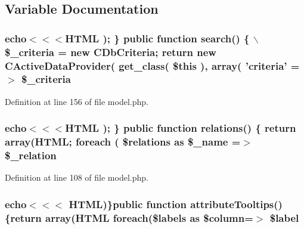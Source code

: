 \subsection{Variable Documentation}
\hypertarget{gii_2model_2templates_2default_2model_8php_a28a116c3d6d8901fe4023b3d9bf7bf4c}{
\subsubsection[{\$\_\-criteria}]{\setlength{\rightskip}{0pt plus 5cm}echo$<$$<$$<${\bf HTML} ); \} public function search() \{ $\backslash$\$\_\-criteria = new CDbCriteria; return new CActiveDataProvider( get\_\-class( \$this ), {\bf array}( 'criteria' =$>$ \$\_\-criteria}}
\label{gii_2model_2templates_2default_2model_8php_a28a116c3d6d8901fe4023b3d9bf7bf4c}


Definition at line 156 of file model.php.

\hypertarget{gii_2model_2templates_2default_2model_8php_aaf1b455f91b5583cb37930979eedc6d5}{
\subsubsection[{\$\_\-relation}]{\setlength{\rightskip}{0pt plus 5cm}echo$<$$<$$<${\bf HTML} ); \} public function relations() \{ return {\bf array}({\bf HTML}; {\bf foreach} ( \$relations as \$\_\-name =$>$ \$\_\-relation}}
\label{gii_2model_2templates_2default_2model_8php_aaf1b455f91b5583cb37930979eedc6d5}


Definition at line 108 of file model.php.

\hypertarget{gii_2model_2templates_2default_2model_8php_a92ae3eac75e60335c146412727e9aa46}{
\subsubsection[{\$label}]{\setlength{\rightskip}{0pt plus 5cm}echo$<$$<$$<$ {\bf HTML})\}public function attributeTooltips()\{return {\bf array}({\bf HTML} {\bf foreach}(\$labels as \$column=$>$ \$label}}
\label{gii_2model_2templates_2default_2model_8php_a92ae3eac75e60335c146412727e9aa46}


